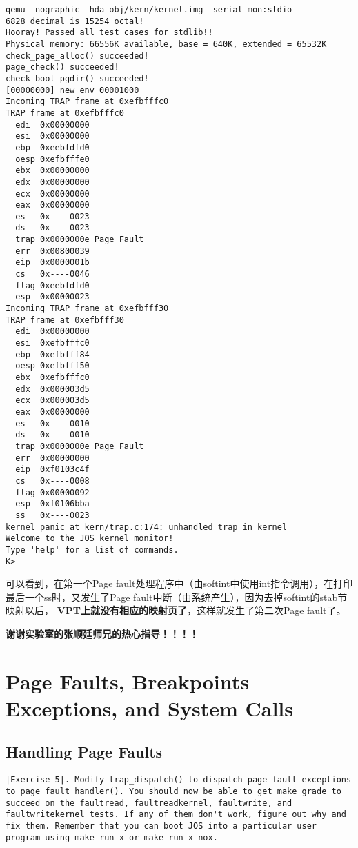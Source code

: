 \documentclass{article}
\newcommand{\highlight}[1]{{\bfseries \color{red}  #1}}
\begin{document}
\begin{CJK*}{UTF8}{gkai}
\begin{enumerate}
{\begin{lstlisting}[style=console]
qemu -nographic -hda obj/kern/kernel.img -serial mon:stdio
6828 decimal is 15254 octal!
Hooray! Passed all test cases for stdlib!!
Physical memory: 66556K available, base = 640K, extended = 65532K
check_page_alloc() succeeded!
page_check() succeeded!
check_boot_pgdir() succeeded!
[00000000] new env 00001000
Incoming TRAP frame at 0xefbfffc0
TRAP frame at 0xefbfffc0
  edi  0x00000000
  esi  0x00000000
  ebp  0xeebfdfd0
  oesp 0xefbfffe0
  ebx  0x00000000
  edx  0x00000000
  ecx  0x00000000
  eax  0x00000000
  es   0x----0023
  ds   0x----0023
  trap 0x0000000e Page Fault
  err  0x00800039
  eip  0x0000001b
  cs   0x----0046
  flag 0xeebfdfd0
  esp  0x00000023
Incoming TRAP frame at 0xefbfff30
TRAP frame at 0xefbfff30
  edi  0x00000000
  esi  0xefbfffc0
  ebp  0xefbfff84
  oesp 0xefbfff50
  ebx  0xefbfffc0
  edx  0x000003d5
  ecx  0x000003d5
  eax  0x00000000
  es   0x----0010
  ds   0x----0010
  trap 0x0000000e Page Fault
  err  0x00000000
  eip  0xf0103c4f
  cs   0x----0008
  flag 0x00000092
  esp  0xf0106bba
  ss   0x----0023
kernel panic at kern/trap.c:174: unhandled trap in kernel
Welcome to the JOS kernel monitor!
Type 'help' for a list of commands.
K> 

\end{lstlisting}

可以看到，在第一个Page fault处理程序中（由softint中使用int指令调用），在打印最后一个ss时，又发生了Page fault中断（由系统产生），因为去掉softint的stab节映射以后，\highlight{VPT上就没有相应的映射页了}，这样就发生了第二次Page fault了。


\highlight{\Huge 谢谢实验室的张顺廷师兄的热心指导！！！！}

}
\end{enumerate}





\section{Page Faults, Breakpoints Exceptions, and System Calls}

\subsection{Handling Page Faults}

\begin{lstlisting}[style=exercise]
|Exercise 5|. Modify trap_dispatch() to dispatch page fault exceptions to page_fault_handler(). You should now be able to get make grade to succeed on the faultread, faultreadkernel, faultwrite, and faultwritekernel tests. If any of them don't work, figure out why and fix them. Remember that you can boot JOS into a particular user program using make run-x or make run-x-nox.
\end{lstlisting}


\end{CJK*}
\end{document}
